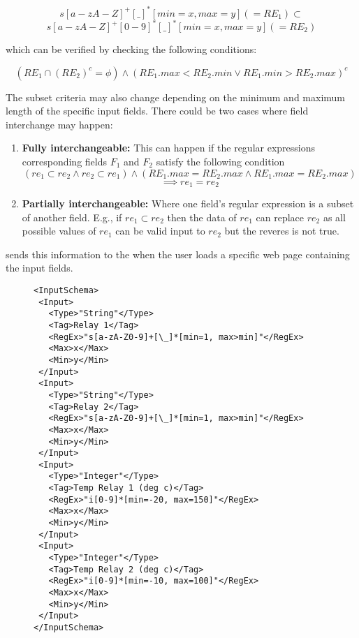 \[s[a-zA-Z]^+[\_]^*[min=x, max=y] (=RE_1)\subset\] 
\[
s[a-zA-Z]^+[0-9]^*[\_]^*[min=x, max=y] (=RE_2)
\]

which can be verified by checking the following conditions:

\[
(RE_1\cap (RE_2)^c = \phi) \wedge (RE_1.max < RE_2.min \vee RE_1.min > RE_2.max)^c
\]

The subset criteria may also change depending on the minimum and maximum length of the specific input fields. There could be two cases where field interchange may happen:
\begin{enumerate}
  \item \textbf{Fully interchangeable:} This can happen if the regular expressions corresponding fields $F_1$ and $F_2$ satisfy the following condition
  \[
  (re_1 \subset re_2 \wedge re_2 \subset re_1) \wedge (RE_1.max = RE_2.max \wedge RE_1.max = RE_2.max) 
  \]
  \[
  \implies  re_1 = re_2
  \]

  \item \textbf{Partially interchangeable:} Where one field's regular expression is a subset of another field. E.g., if $re_1 \subset re_2$ then the data of $re_1$ can replace $re_2$ as all possible values of $re_1$ can be valid input to $re_2$ but the reveres is not true.  
\end{enumerate}

\server sends this information to the \device when the user loads a specific web page containing the input fields.

\lstset{language=XML, caption=Specification of the input fields by the developers, label = snippet:specificationXML, firstnumber =1}
\begin{figure}[t]
\begin{lstlisting}[mathescape=true]
<InputSchema>
 <Input>
   <Type>"String"</Type>
   <Tag>Relay 1</Tag>
   <RegEx>"s[a-zA-Z0-9]+[\_]*[min=1, max>min]"</RegEx>
   <Max>x</Max>
   <Min>y</Min>
 </Input>
 <Input>
   <Type>"String"</Type>
   <Tag>Relay 2</Tag>
   <RegEx>"s[a-zA-Z0-9]+[\_]*[min=1, max>min]"</RegEx>
   <Max>x</Max>
   <Min>y</Min>
 </Input>
 <Input>
   <Type>"Integer"</Type>
   <Tag>Temp Relay 1 (deg c)</Tag>
   <RegEx>"i[0-9]*[min=-20, max=150]"</RegEx>
   <Max>x</Max>
   <Min>y</Min>
 </Input>
 <Input>
   <Type>"Integer"</Type>
   <Tag>Temp Relay 2 (deg c)</Tag>
   <RegEx>"i[0-9]*[min=-10, max=100]"</RegEx>
   <Max>x</Max>
   <Min>y</Min>
 </Input>
</InputSchema>
\end{lstlisting} 
\end{figure}

